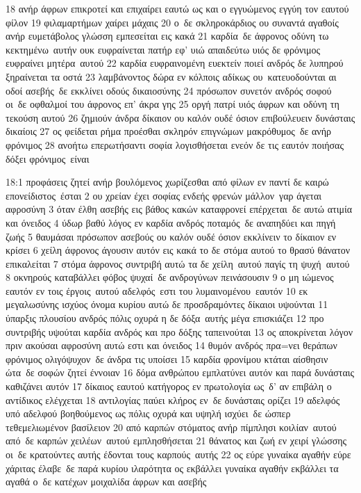\documentclass[10pt,oneside,footinclude=true,headinclude=true]{scrbook} %
\begin{document}
18 ανήρ άφρων επικροτεί και επιχαίρει εαυτώ ως και ο εγγυώμενος εγγύη τον εαυτού φίλον
19 φιλαμαρτήμων χαίρει μάχαις
20 ο δε σκληροκάρδιος ου συναντά αγαθοίς ανήρ ευμετάβολος γλώσση εμπεσείται εις κακά
21 καρδία δε άφρονος οδύνη τω κεκτημένω αυτήν ουκ ευφραίνεται πατήρ εφ' υιώ απαιδεύτω υιός δε φρόνιμος ευφραίνει μητέρα αυτού
22 καρδία ευφραινομένη ευεκτείν ποιεί ανδρός δε λυπηρού ξηραίνεται τα οστά
23 λαμβάνοντος δώρα εν κόλποις αδίκως ου κατευοδούνται αι οδοί ασεβής δε εκκλίνει οδούς δικαιοσύνης
24 πρόσωπον συνετόν ανδρός σοφού οι δε οφθαλμοί του άφρονος επ' άκρα γης
25 οργή πατρί υιός άφρων και οδύνη τη τεκούση αυτού
26 ζημιούν άνδρα δίκαιον ου καλόν ουδέ όσιον επιβούλευειν δυνάσταις δικαίοις
27 ος φείδεται ρήμα προέσθαι σκληρόν επιγνώμων μακρόθυμος δε ανήρ φρόνιμος
28 ανοήτω επερωτήσαντι σοφία λογισθήσεται ενεόν δε τις εαυτόν ποιήσας δόξει φρόνιμος είναι
\par
18:1 προφάσεις ζητεί ανήρ βουλόμενος χωρίζεσθαι από φίλων εν παντί δε καιρώ επονείδιστος έσται
2 ου χρείαν έχει σοφίας ενδεής φρενών μάλλον γαρ άγεται αφροσύνη
3 όταν έλθη ασεβής εις βάθος κακών καταφρονεί επέρχεται δε αυτώ ατιμία και όνειδος
4 ύδωρ βαθύ λόγος εν καρδία ανδρός ποταμός δε αναπηδύει και πηγή ζωής
5 θαυμάσαι πρόσωπον ασεβούς ου καλόν ουδέ όσιον εκκλίνειν το δίκαιον εν κρίσει
6 χείλη άφρονος άγουσιν αυτόν εις κακά το δε στόμα αυτού το θρασύ θάνατον επικαλείται
7 στόμα άφρονος συντριβή αυτώ τα δε χείλη αυτού παγίς τη ψυχή αυτού
8 οκνηρούς καταβάλλει φόβος ψυχαί δε ανδρογύνων πεινάσουσιν
9 ο μη ιώμενος εαυτόν εν τοις έργοις αυτού αδελφός εστι του λυμαινομένου εαυτόν
10 εκ μεγαλωσύνης ισχύος όνομα κυρίου αυτώ δε προσδραμόντες δίκαιοι υψούνται
11 ύπαρξις πλουσίου ανδρός πόλις οχυρά η δε δόξα αυτής μέγα επισκιάζει
12 προ συντριβής υψούται καρδία ανδρός και προ δόξης ταπεινούται
13 ος αποκρίνεται λόγον πριν ακούσαι αφροσύνη αυτώ εστι και όνειδος
14 θυμόν ανδρός πρα=νει θεράπων φρόνιμος ολιγόψυχον δε άνδρα τις υποίσει
15 καρδία φρονίμου κτάται αίσθησιν ώτα δε σοφών ζητεί έννοιαν
16 δόμα ανθρώπου εμπλατύνει αυτόν και παρά δυνάσταις καθιζάνει αυτόν
17 δίκαιος εαυτού κατήγορος εν πρωτολογία ως δ' αν επιβάλη ο αντίδικος ελέγχεται
18 αντιλογίας παύει κλήρος εν δε δυνάσταις ορίζει
19 αδελφός υπό αδελφού βοηθούμενος ως πόλις οχυρά και υψηλή ισχύει δε ώσπερ τεθεμελιωμένον βασίλειον
20 από καρπών στόματος ανήρ πίμπλησι κοιλίαν αυτού από δε καρπών χειλέων αυτού εμπλησθήσεται
21 θάνατος και ζωή εν χειρί γλώσσης οι δε κρατούντες αυτής έδονται τους καρπούς αυτής
22 ος εύρε γυναίκα αγαθήν εύρε χάριτας έλαβε δε παρά κυρίου ιλαρότητα ος εκβάλλει γυναίκα αγαθήν εκβάλλει τα αγαθά ο δε κατέχων μοιχαλίδα άφρων και ασεβής
\end{document}
